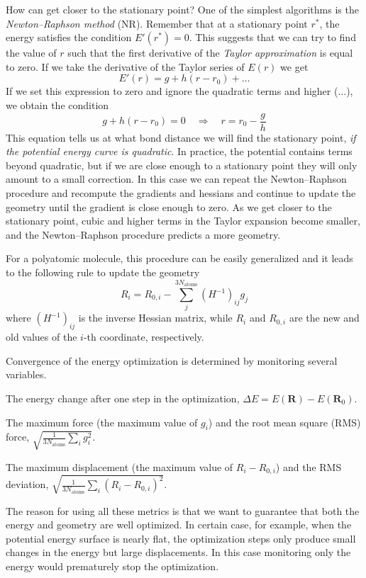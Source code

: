\documentclass[../Main/chem371-notes.tex]{subfiles}
\begin{document}
How can get closer to the stationary point?
One of the simplest algorithms is the \emph{Newton--Raphson method} (NR).
Remember that at a stationary point $r^*$, the energy satisfies the condition $E'(r^*) = 0$. This suggests that we can try to find the value of $r$ such that the first derivative of the \emph{Taylor approximation} is equal to zero.
If we take the derivative of the Taylor series of $E(r)$ we get
\begin{equation}
E'(r)  = g + h (r - r_0) + \ldots 
\end{equation}
If we set this expression to zero and ignore the quadratic terms and higher ($\ldots$), we obtain the condition
\begin{equation}
g + h ( r - r_0) = 0 \quad \Rightarrow 
\quad 
r = r_0 - \frac{g}{h}
\end{equation}
This equation tells us at what bond distance we will find the stationary point, \emph{if the potential energy curve is quadratic}. In practice, the potential contains terms beyond quadratic, but if we are close enough to a stationary point they will only amount to a small correction.
In this case we can repeat the Newton--Raphson procedure and recompute the gradients and hessians and continue to update the geometry until the gradient is close enough to zero.
As we get closer to the stationary point, cubic and higher terms in the Taylor expansion become smaller, and the Newton--Raphson procedure predicts a more geometry.

For a polyatomic molecule, this procedure can be easily generalized and it leads to the following rule to update the geometry
\begin{equation}
R_i = R_{0,i} - \sum_{j}^{3 N_\mathrm{atoms}}(H^{-1})_{ij} g_j
\end{equation}
where $(H^{-1})_{ij}$ is the inverse Hessian matrix, while $R_i$ and $R_{0,i}$ are the new and old values of the $i$-th coordinate, respectively.

Convergence of the energy optimization is determined by monitoring several variables.
\begin{myitems}
\item The energy change after one step in the optimization, $\Delta E = E(\mathbf{R}) - E(\mathbf{R}_0)$.
\item The maximum force (the maximum value of $g_i$) and the root mean square (RMS) force, $\sqrt{\frac{1}{3 N_\mathrm{atoms}}\sum_i g_i^2}$.
\item The maximum displacement (the maximum value of $R_i - R_{0,i}$) and the RMS deviation, $\sqrt{\frac{1}{3 N_\mathrm{atoms}}\sum_i (R_i - R_{0,i})^2}$.
\end{myitems}
The reason for using all these metrics is that we want to guarantee that both the energy and geometry are well optimized.
In certain case, for example, when the potential energy surface is nearly flat, the optimization steps only produce small changes in the energy but large displacements.
In this case monitoring only the energy would prematurely stop the optimization.
\end{document}
